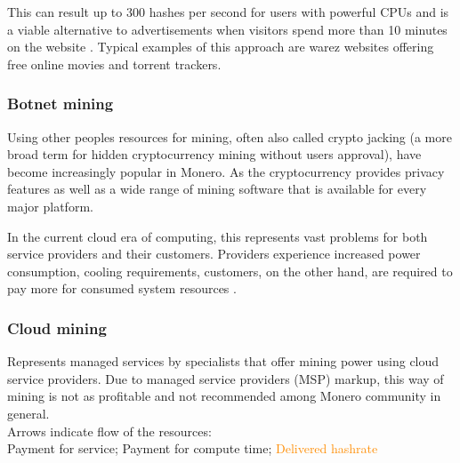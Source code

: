 \documentclass[
  printed, %
  table,   %
  lof,     %
  lot,     %
           oneside, color
]{fithesis3}
\begin{document}
This can result up to 300 hashes per second for users with powerful CPUs and is a viable alternative to advertisements when visitors spend more than 10 minutes on the website \cite{papadopoulos2018truth}. Typical examples of this approach are warez websites offering free online movies and torrent trackers.
\subsubsection{Botnet mining}
Using other peoples resources for mining, often also called crypto jacking (a more broad term for hidden cryptocurrency mining without users approval), have become increasingly popular in Monero. As the cryptocurrency provides privacy features as well as a wide range of mining software that is available for every major platform.

In the current cloud era of computing, this represents vast problems for both service providers and their customers. Providers experience increased power consumption, cooling requirements, customers, on the other hand, are required to pay more for consumed system resources \cite{tahir2017mining}.

\subsubsection{Cloud mining}
Represents managed services by specialists that offer mining power using cloud service providers. Due to managed service providers (MSP) markup, this way of mining is not as profitable and not recommended among Monero community in general. \\Arrows indicate flow of the resources:\\ \textcolor{ao(english)} {Payment for service}; \textcolor{azure(colorwheel)}{Payment for compute time}; \textcolor{darkorange}{Delivered hashrate}
\end{document}
